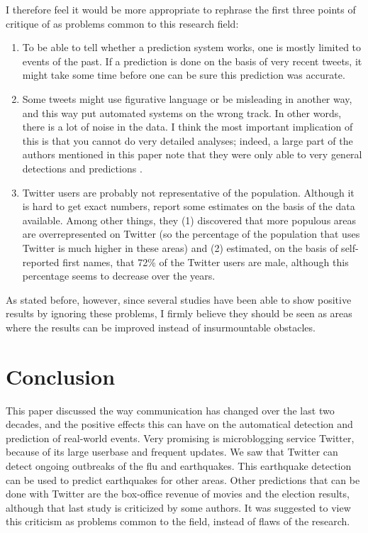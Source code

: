 \documentclass[12pt]{article}
\begin{document}
I therefore feel it would be more appropriate to rephrase the first three points of critique of  as problems common to this research field:

\begin{enumerate}
\item To be able to tell whether a prediction system works, one is mostly limited to events of the past. If a prediction is done on the basis of very recent tweets, it might take some time before one can be sure this prediction was accurate.
\item Some tweets might use figurative language or be misleading in another way, and this way put automated systems on the wrong track. In other words, there is a lot of noise in the data. I think the most important implication of this is that you cannot do very detailed analyses; indeed, a large part of the authors mentioned in this paper note that they were only able to very general detections and predictions .
\item Twitter users are probably not representative of the population. Although it is hard to get exact numbers,  report some estimates on the basis of the data available. Among other things, they (1) discovered that more populous areas are overrepresented on Twitter (so the percentage of the population that uses Twitter is much higher in these areas) and (2) estimated, on the basis of self-reported first names, that 72\% of the Twitter users are male, although this percentage seems to decrease over the years.
\end{enumerate}

As stated before, however, since several studies have been able to show positive results by ignoring these problems, I firmly believe they should be seen as areas where the results can be improved instead of insurmountable obstacles.

\section{Conclusion} \label{conclusion}

This paper discussed the way communication has changed over the last two decades, and the positive effects this can have on the automatical detection and prediction of real-world events. Very promising is microblogging service Twitter, because of its large userbase and frequent updates. We saw that Twitter can detect ongoing outbreaks of the flu and earthquakes. This earthquake detection can be used to predict earthquakes for other areas. Other predictions that can be done with Twitter are the box-office revenue of movies and the election results, although that last study is criticized by some authors. It was suggested to view this criticism as problems common to the field, instead of flaws of the research.

{}

\end{document}
